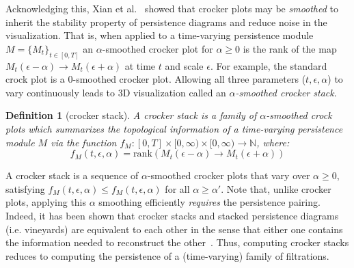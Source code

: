 \documentclass{article} %
\newtheorem{definition}{Definition}
\begin{document}
Acknowledging this, Xian et al.~\cite{xian2020capturing} showed that crocker plots may be \emph{smoothed} to inherit the stability property of persistence diagrams and reduce noise in the visualization. That is, when applied to a time-varying persistence module $M = \{M_t\}_{t \in [0, T]}$ an $\alpha$-smoothed crocker plot for $\alpha \geq 0$ is the rank of the map $M_t(\epsilon - \alpha) \to M_t(\epsilon + \alpha)$ at time $t$ and scale $\epsilon$. For example, the standard crock plot is a $0$-smoothed crocker plot. Allowing all three parameters ($t, \epsilon, \alpha$) to vary continuously leads to 3D visualization called an $\alpha$\emph{-smoothed crocker stack}.
\begin{definition}[crocker stack]
	A crocker stack is a family of $\alpha$-smoothed crock plots which summarizes the topological information of a time-varying persistence module $M$ via the function $f_M : [0, T] \times [0, \infty) \times [0, \infty) \to \mathbb{N}$, where:
	$$ f_M(t,\epsilon, \alpha) = \mathrm{rank}(M_t(\epsilon - \alpha) \to M_t(\epsilon + \alpha)) $$
\end{definition}
\noindent A crocker stack is a sequence of $\alpha$-smoothed crocker plots that vary over $\alpha \geq 0$, satisfying $f_M(t,\epsilon,\alpha) \leq f_M(t,\epsilon, \alpha)$ for all $\alpha \geq \alpha'$. Note that, unlike crocker plots, applying this $\alpha$ smoothing efficiently \emph{requires} the persistence pairing. Indeed, it has been shown that crocker stacks and stacked persistence diagrams (i.e. vineyards) are equivalent to each other in the sense that either one contains the information needed to reconstruct the other~\cite{xian2020capturing}. Thus, computing crocker stacks reduces to computing the persistence of a (time-varying) family of filtrations.

\end{document}
